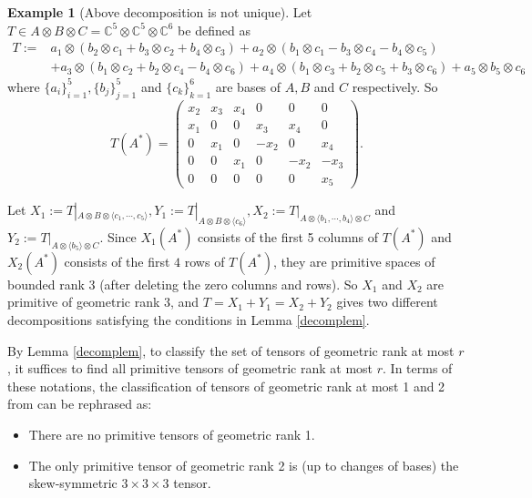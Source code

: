 \documentclass[10pt]{article} %
\newcommand{\BC}{\mathbb{C}}
\newcommand{\ot}{\otimes}
\theoremstyle{definition}
\newtheorem{ex}[thm]{Example}
\begin{document}
\begin{ex}[Above decomposition is not unique]
Let $T\in A\ot B\ot C=\BC^5\ot\BC^5\ot\BC^6$ be defined as
\begin{align*}
T:=&a_1\ot(b_2\ot c_1+b_3\ot c_2+b_4\ot c_3)+a_2\ot(b_1\ot c_1 -b_3\ot c_4 -b_4\ot c_5)\\
&+a_3\ot(b_1\ot c_2+b_2\ot c_4 -b_4\ot c_6)+a_4\ot(b_1\ot c_3 + b_2\ot c_5 +b_3\ot c_6)+a_5\ot b_5\ot c_6
\end{align*}
where $\{a_i\}_{i=1}^{5},\{b_j\}_{j=1}^{5}$ and $\{c_k\}_{k=1}^{6}$ are bases of $A,B$ and $C$ respectively. So
$$T(A^*)=\begin{pmatrix}
x_2 & x_3 & x_4 & 0 & 0 & 0\\
x_1 & 0 & 0 & x_3 & x_4 & 0\\
0 & x_1 & 0 & -x_2 & 0 & x_4\\
0 & 0 & x_1 & 0 & -x_2 & -x_3\\
0 & 0 & 0 & 0 & 0 & x_5
\end{pmatrix}.$$

Let $X_1:=T|_{A\ot B\ot \langle c_1,\cdots,c_5\rangle},Y_1:=T|_{A\ot B\ot \langle c_6\rangle}, X_2:=T|_{A\ot \langle b_1,\cdots,b_4\rangle\ot C}$ and $Y_2:=T|_{A\ot \langle b_5 \rangle \ot C}$. Since $X_1(A^*)$ consists of the first 5 columns of $T(A^*)$ and $X_2(A^*)$ consists of the first $4$ rows of $T(A^*)$, they are primitive spaces of bounded rank 3 (after deleting the zero columns and rows). So $X_1$ and $X_2$ are primitive of geometric rank $3$, and $T=X_1+Y_1=X_2+Y_2$ gives two different decompositions satisfying the conditions in Lemma \ref{decomplem}.
\end{ex}

By Lemma \ref{decomplem}, to classify the set of tensors of geometric rank at most $r$, it suffices to find all primitive tensors of geometric rank at most $r$. In terms of these notations, the classification of tensors of geometric rank at most 1 and 2 from \cite[Remark~2.6, Theorem~3.1]{GL20} can be rephrased as: 
\begin{itemize}
    \item There are no primitive tensors of geometric rank 1.
    \item The only primitive tensor of geometric rank 2 is (up to changes of bases) the skew-symmetric $3\times3\times3$ tensor.
\end{itemize}
\end{document}
